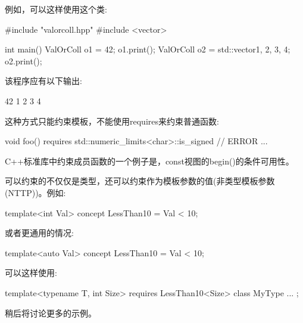 例如，可以这样使用这个类:


\begin{cpp}
#include "valorcoll.hpp"
#include <vector>

int main()
{
	ValOrColl o1 = 42;
	o1.print();
	ValOrColl o2 = std::vector{1, 2, 3, 4};
	o2.print();
}
\end{cpp}

该程序应有以下输出:

\begin{shell}
42
1 2 3 4
\end{shell}

这种方式只能约束模板，不能使用requires来约束普通函数:

\begin{cpp}
void foo() requires std::numeric_limits<char>::is_signed // ERROR
{
	...
}
\end{cpp}

C++标准库中约束成员函数的一个例子是，const视图的begin()的条件可用性。


可以约束的不仅仅是类型，还可以约束作为模板参数的值(非类型模板参数(NTTP))。例如:

\begin{cpp}
template<int Val>
concept LessThan10 = Val < 10;
\end{cpp}

或者更通用的情况:

\begin{cpp}
template<auto Val>
concept LessThan10 = Val < 10;
\end{cpp}

可以这样使用:

\begin{cpp}
template<typename T, int Size>
requires LessThan10<Size>
class MyType {
	...
};
\end{cpp}

稍后将讨论更多的示例。










